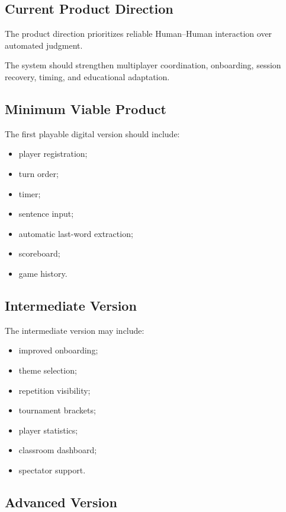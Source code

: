 \documentclass[11pt,a4paper]{article}
\begin{document}
\subsection{Current Product Direction}

The product direction prioritizes reliable Human--Human interaction over automated judgment.

The system should strengthen multiplayer coordination, onboarding, session recovery, timing, and educational adaptation.

\subsection{Minimum Viable Product}

The first playable digital version should include:

\begin{itemize}
    \item player registration;
    \item turn order;
    \item timer;
    \item sentence input;
    \item automatic last-word extraction;
    \item scoreboard;
    \item game history.
\end{itemize}

\subsection{Intermediate Version}

The intermediate version may include:

\begin{itemize}
    \item improved onboarding;
    \item theme selection;
    \item repetition visibility;
    \item tournament brackets;
    \item player statistics;
    \item classroom dashboard;
    \item spectator support.
\end{itemize}

\subsection{Advanced Version}
\end{document}
